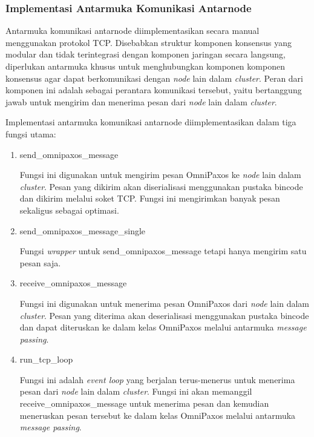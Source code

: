 \subsubsection{Implementasi Antarmuka Komunikasi Antarnode}
\label{subsubsection:implementasi-antarmuka-komunikasi-antarnode}

Antarmuka komunikasi antarnode diimplementasikan secara manual menggunakan protokol TCP. Disebabkan struktur komponen konsensus yang modular dan tidak terintegrasi dengan komponen jaringan secara langsung, diperlukan antarmuka khusus untuk menghubungkan komponen komponen konsensus agar dapat berkomunikasi dengan \textit{node} lain dalam \textit{cluster}. Peran dari komponen ini adalah sebagai perantara komunikasi tersebut, yaitu bertanggung jawab untuk mengirim dan menerima pesan dari \textit{node} lain dalam \textit{cluster}.

Implementasi antarmuka komunikasi antarnode diimplementasikan dalam tiga fungsi utama:
\begin{enumerate}
  \item send\_omnipaxos\_message
  
  Fungsi ini digunakan untuk mengirim pesan OmniPaxos ke \textit{node} lain dalam \textit{cluster}. Pesan yang dikirim akan diserialisasi menggunakan pustaka bincode dan dikirim melalui soket TCP. Fungsi ini mengirimkan banyak pesan sekaligus sebagai optimasi.

  \item send\_omnipaxos\_message\_single
  
  Fungsi \textit{wrapper} untuk send\_omnipaxos\_message tetapi hanya mengirim satu pesan saja.

  \item receive\_omnipaxos\_message
  
  Fungsi ini digunakan untuk menerima pesan OmniPaxos dari \textit{node} lain dalam \textit{cluster}. Pesan yang diterima akan deserialisasi menggunakan pustaka bincode dan dapat diteruskan ke dalam kelas OmniPaxos melalui antarmuka \textit{message passing}.

  \item run\_tcp\_loop
  
  Fungsi ini adalah \textit{event loop} yang berjalan terus-menerus untuk menerima pesan dari \textit{node} lain dalam \textit{cluster}. Fungsi ini akan memanggil receive\_omnipaxos\_message untuk menerima pesan dan kemudian meneruskan pesan tersebut ke dalam kelas OmniPaxos melalui antarmuka \textit{message passing}.
\end{enumerate}

